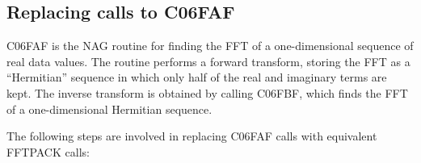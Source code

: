 \documentclass[11pt,twoside]{article}
\newcommand{\xlabel}[1]{}
\begin{document}

\subsection{\xlabel{replacing_calls_to_c06faf}Replacing calls to C06FAF}

   C06FAF is the NAG routine for finding the FFT of a one-dimensional
   sequence of real data values. The routine performs a forward
   transform, storing the FFT as a ``Hermitian'' sequence in which only
   half of the real and imaginary terms are kept. The inverse transform
   is obtained by calling C06FBF, which finds the FFT of a one-dimensional
   Hermitian sequence.

   The following steps are involved in replacing C06FAF calls with
   equivalent FFTPACK calls:
\end{document}
